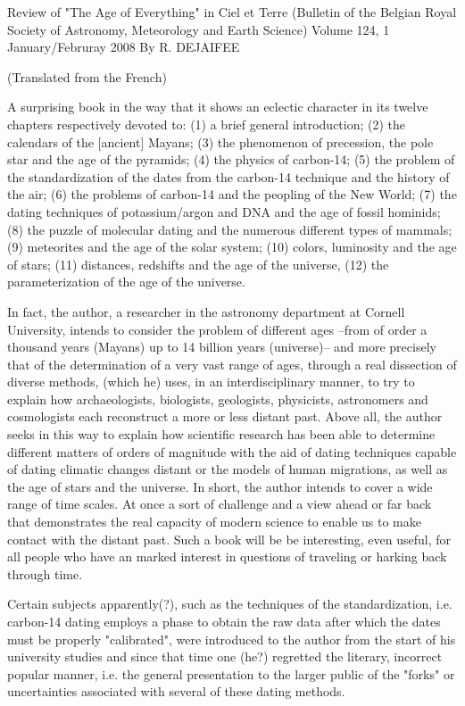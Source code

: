 Review of "The Age of Everything" in 
Ciel et Terre (Bulletin of the Belgian Royal Society of Astronomy, Meteorology and Earth Science)
Volume 124, 1 January/Februray 2008
By R. DEJAIFEE

(Translated from the French)

A surprising book in the way that it shows an eclectic character in its twelve chapters respectively devoted to: (1) a brief general introduction; (2) the calendars of the [ancient] Mayans; (3) the phenomenon of precession, the pole star and the age of the pyramids; (4) the physics of carbon-14; (5) the problem of the standardization of the dates from the carbon-14 technique and the history of the air; (6) the problems of carbon-14 and the peopling of the New World; (7) the dating techniques of potassium/argon and DNA and the age of fossil hominids; (8) the puzzle of molecular dating and the numerous different types of mammals; (9) meteorites and the age of the solar system; (10) colors, luminosity and the age of stars; (11) distances, redshifts and the age of the universe, (12) the parameterization of the age of the universe.

In fact, the author, a researcher in the astronomy department at Cornell University, intends to consider the problem of different ages --from of order a thousand years (Mayans) up to 14 billion years (universe)-- and more precisely that of the determination of a very vast range of ages, through a real dissection of diverse methods, (which he) uses, in an interdisciplinary manner, to try to explain how archaeologists, biologists, geologists, physicists, astronomers and cosmologists each reconstruct a more or less distant past. Above all, the author seeks in this way to explain how scientific research
has been able  to determine different matters of orders of magnitude with the aid of dating techniques capable of dating climatic changes distant or the models of human migrations, as well as the age of stars and the universe. In short, the author intends to cover a wide range of  time scales. At once a sort of challenge and a view ahead or far back that demonstrates the real capacity of modern science to enable us to make contact with the distant past. Such a book will be be interesting, even useful, for all people who have an marked interest in questions of traveling or harking back through  time. 

Certain subjects apparently(?), such as the techniques of the standardization, i.e. carbon-14 dating employs a phase to obtain the raw data after which  the dates must be properly "calibrated",  were introduced to  the author from the start of his university studies and since that time one (he?) regretted the literary, incorrect popular manner, i.e.  the general presentation to the larger public of the "forks" or uncertainties associated with several of these dating methods.

